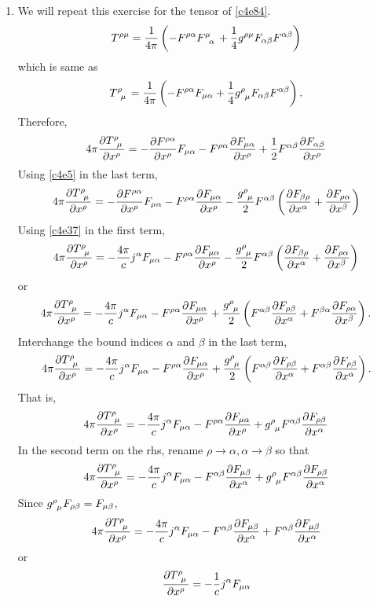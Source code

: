 \begin{enumerate}
\item We will repeat this exercise for the tensor of \eqref{c4e84}.
\[
T^{\rho\mu} = \frac{1}{4\pi}\left(-F^{\rho\alpha}\tensor{F}{^\mu_\alpha} +
\frac{1}{4}g^{\rho\mu}F_{\alpha\beta}F^{\alpha\beta}\right)
\]
which is same as
\[
\tensor{T}{^\rho_\mu} = \frac{1}{4\pi}\left(-F^{\rho\alpha}F_{\mu\alpha} +
\frac{1}{4}\tensor{g}{^\rho_\mu}F_{\alpha\beta}F^{\alpha\beta}\right).
\]
Therefore,
\[
4\pi\pdt{\tensor{T}{^\rho_\mu}}{x^\rho} = -\pdt{F^{\rho\alpha}}{x^\rho}F_{\mu\alpha}
- F^{\rho\alpha}\pdt{F_{\mu\alpha}}{x^\rho} + \frac{1}{2}F^{\alpha\beta}\pdt{F_{\alpha\beta}}{x^\rho}
\]
Using \eqref{c4e5} in the last term,
\[
4\pi\pdt{\tensor{T}{^\rho_\mu}}{x^\rho} = -\pdt{F^{\rho\alpha}}{x^\rho}F_{\mu\alpha}
- F^{\rho\alpha}\pdt{F_{\mu\alpha}}{x^\rho} - \frac{\tensor{g}{^\rho_\mu}}{2}
 F^{\alpha\beta}\left(\pdt{F_{\beta\rho}}{x^\alpha} + \pdt{F_{\rho\alpha}}{x^\beta}\right)
\]
Using \eqref{c4e37} in the first term,
\[
4\pi\pdt{\tensor{T}{^\rho_\mu}}{x^\rho} = -\frac{4\pi}{c}j^\alpha F_{\mu\alpha}
- F^{\rho\alpha}\pdt{F_{\mu\alpha}}{x^\rho} - \frac{\tensor{g}{^\rho_\mu}}{2}F^{\alpha\beta}
\left(\pdt{F_{\beta\rho}}{x^\alpha} + \pdt{F_{\rho\alpha}}{x^\beta}\right)
\]
or
\[
4\pi\pdt{\tensor{T}{^\rho_\mu}}{x^\rho} = -\frac{4\pi}{c}j^\alpha F_{\mu\alpha}
- F^{\rho\alpha}\pdt{F_{\mu\alpha}}{x^\rho} + \frac{\tensor{g}{^\rho_\mu}}{2}
\left(F^{\alpha\beta}\pdt{F_{\rho\beta}}{x^\alpha} + F^{\beta\alpha}\pdt{F_{\rho\alpha}}{x^\beta}\right).
\]
Interchange the bound indices $\alpha$ and $\beta$ in the last term,
\[
4\pi\pdt{\tensor{T}{^\rho_\mu}}{x^\rho} = -\frac{4\pi}{c}j^\alpha F_{\mu\alpha}
- F^{\rho\alpha}\pdt{F_{\mu\alpha}}{x^\rho} + \frac{\tensor{g}{^\rho_\mu}}{2}
\left(F^{\alpha\beta}\pdt{F_{\rho\beta}}{x^\alpha} + F^{\alpha\beta}\pdt{F_{\rho\beta}}{x^\alpha}\right).
\]
That is,
\[
4\pi\pdt{\tensor{T}{^\rho_\mu}}{x^\rho} = -\frac{4\pi}{c}j^\alpha F_{\mu\alpha}
- F^{\rho\alpha}\pdt{F_{\mu\alpha}}{x^\rho} + \tensor{g}{^\rho_\mu}
F^{\alpha\beta}\pdt{F_{\rho\beta}}{x^\alpha}
\]
In the second term on the rhs, rename $\rho \rightarrow \alpha, \alpha \rightarrow
\beta$ so that
\[
4\pi\pdt{\tensor{T}{^\rho_\mu}}{x^\rho} = -\frac{4\pi}{c}j^\alpha F_{\mu\alpha}
- F^{\alpha\beta}\pdt{F_{\mu\beta}}{x^\alpha} + \tensor{g}{^\rho_\mu}
F^{\alpha\beta}\pdt{F_{\rho\beta}}{x^\alpha}
\]
Since $\tensor{g}{^\rho_\mu} F_{\rho\beta} = F_{\mu\beta}$,
\[
4\pi\pdt{\tensor{T}{^\rho_\mu}}{x^\rho} = -\frac{4\pi}{c}j^\alpha F_{\mu\alpha}
- F^{\alpha\beta}\pdt{F_{\mu\beta}}{x^\alpha} + F^{\alpha\beta}\pdt{F_{\mu\beta}}{x^\alpha}
\]
or
\begin{equation}\label{c4e98}
\pdt{\tensor{T}{^\rho_\mu}}{x^\rho} = -\frac{1}{c}j^\alpha F_{\mu\alpha}
\end{equation}


\end{enumerate}
